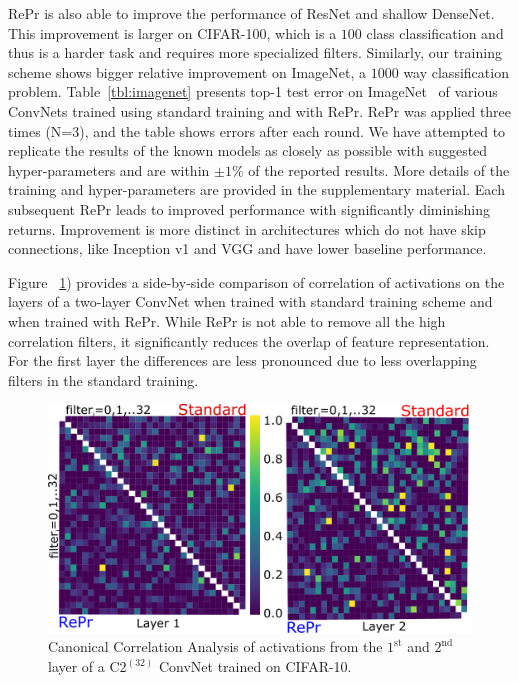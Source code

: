 RePr is also able to improve the performance of ResNet and shallow DenseNet.
This improvement is larger on CIFAR-100, which is a $100$ class classification and thus is a harder task and requires more specialized filters.
Similarly, our training scheme shows bigger relative improvement on ImageNet, a $1000$ way classification problem.
Table~\ref{tbl:imagenet} presents top-1 test error on ImageNet~\cite{Russakovsky2015ImageNetLS} of various ConvNets trained using standard training and with RePr.
RePr was applied three times (N=3), and the table shows errors after each round.
We have attempted to replicate the results of the known models as closely as possible with suggested hyper-parameters and are within $\pm 1\%$ of the reported results.
More details of the training and hyper-parameters are provided in the supplementary material.
Each subsequent RePr leads to improved performance with significantly diminishing returns.
Improvement is more distinct in architectures which do not have skip connections, like Inception v1 and VGG and have lower baseline performance.

Figure ~\ref{fig:CCA_after}) provides a side-by-side comparison of correlation of activations on the layers of a two-layer ConvNet when trained with standard training scheme and when trained with RePr. While RePr is not able to remove all the high correlation filters, it significantly reduces the overlap of feature representation. For the first layer the differences are less pronounced due to less overlapping filters in the standard training.

\begin{figure}[H]
   \includegraphics[width=0.999\linewidth]{figures/repr/filter_CCA_3_second_rebuttal.pdf}
   \caption{Canonical Correlation Analysis of activations from the $1^\text{st}$ and $2^\text{nd}$ layer of a C$2^(32)$ ConvNet trained on CIFAR-10.}
   \label{fig:CCA_after}
\end{figure}

